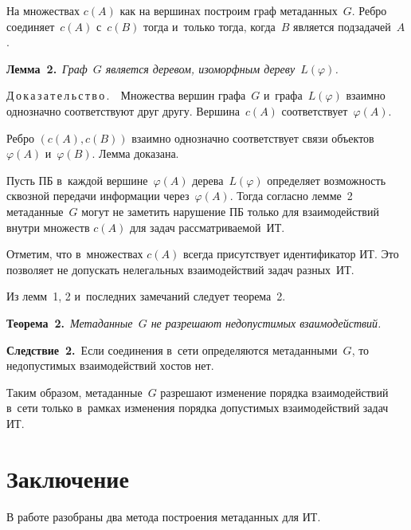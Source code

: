 \begin{multicols}{2}
  На множествах $c(A)$ как на вершинах построим граф метаданных~$G$. Реб\-ро 
со\-еди\-ня\-ет~$c(A)$ с~$c(B)$ тогда и~только тогда, когда~$B$ является 
подзадачей~$A$.
  
  \medskip
  
  \noindent
  \textbf{Лемма~2.}\ \textit{Граф~$G$ является деревом, изоморфным 
дереву~$L(\varphi)$.}
  
  \medskip
  
  \noindent
  Д\,о\,к\,а\,з\,а\,т\,е\,л\,ь\,с\,т\,в\,о\,.\ \ Множества вершин 
графа~$G$ и~графа~$L(\varphi)$ взаимно однозначно соответствуют друг другу. 
Вершина~$c(A)$ соответствует~$\varphi(A)$.
  
  Ребро $(c(A), c(B))$ взаимно однозначно соответствует связи 
объектов~$\varphi(A)$ и~$\varphi(B)$. Лемма доказана.
  
  \medskip
  
  Пусть ПБ в~каж\-дой вершине~$\varphi(A)$ 
дерева~$L(\varphi)$ определяет воз\-мож\-ность сквоз\-ной передачи информации 
через~$\varphi(A)$. Тогда со\-глас\-но лемме~2 метаданные~$G$ могут не заметить 
нарушение ПБ только для взаимодействий внут\-ри множеств 
$c(A)$ для задач рас\-смат\-ри\-ва\-емой~ИТ.
  
  Отметим, что в~множествах $c(A)$ всегда присутствует идентификатор ИТ. Это 
позволяет не допускать нелегальных взаимодействий задач раз\-ных~ИТ.
{

}
  
  Из лемм~1, 2 и~последних замечаний следует тео\-ре\-ма~2.

  \medskip
  
  \noindent
  \textbf{Теорема~2.}\ \textit{Метаданные~$G$ не разрешают недопустимых 
взаимодействий.}
  
  \medskip
  
  \noindent
  \textbf{Следствие~2.}\ Если соединения в~сети определяются 
метаданными~$G$, то недопустимых взаимодействий хос\-тов нет.
  
  Таким образом, метаданные~$G$ разрешают изменение порядка 
взаимодействий в~сети только в~рамках изменения порядка допустимых 
взаимодействий задач ИТ.

  
\section{Заключение}

  В работе разобраны два метода по\-стро\-ения метаданных для 
ИТ. 


\end{multicols}
